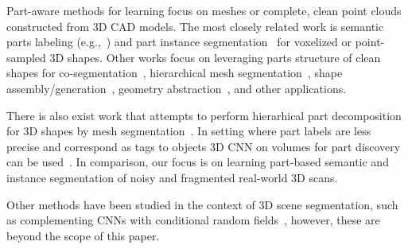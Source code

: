 
Part-aware methods for learning  focus on meshes or complete, clean point clouds constructed from 3D CAD models. The most closely related work  is semantic parts labeling (e.g.,~\cite{yi2016scalable,wang2017cnn,qi2017pointnet,mo2019partnet,yi2019gspn,zhang2019point}) and part instance segmentation~\cite{zhang2019point} for voxelized or point-sampled 3D shapes. Other works focus on leveraging parts structure of clean shapes for co-segmentation~\cite{chen2019bae,zhu2019cosegnet}, hierarchical mesh segmentation~\cite{yi2017learning}, shape assembly/generation~\cite{mo2019structurenet,wu2019sagnet,wu2019pq,mo2020pt2pc}, geometry abstraction~\cite{russell2009associative,li2017grass,sun2019learning}, and other applications.

There is also exist work that attempts to perform hierarhical part decomposition for 3D shapes by mesh segmentation~\cite{yi2017learning}. In setting where part labels are less precise and correspond as tags to objects 3D CNN on volumes for part discovery can be used~\cite{muralikrishnan2018tags2parts}.
In comparison, our focus is on learning part-based semantic and instance segmentation of noisy and fragmented real-world 3D scans. 

Other methods have been studied in the context of 3D scene segmentation, such as complementing CNNs with conditional random fields~\cite{pham2019jsis3d,pham2019real,wang2017cnn}, however, these are beyond the scope of this paper.


